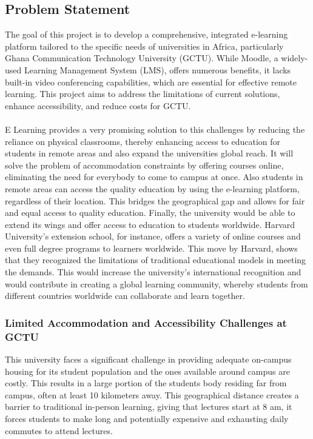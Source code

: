 \documentclass[a4paper,12pt]{article}  %
\begin{document}
\subsection{Problem Statement}
The goal of this project is to develop a comprehensive, integrated e-learning
platform tailored to the specific needs of universities in Africa, particularly
Ghana Communication Technology University (GCTU). While Moodle, a widely-used
Learning Management System (LMS), offers numerous benefits, it lacks built-in
video conferencing capabilities, which are essential for effective remote
learning. This project aims to address the limitations of current solutions,
enhance accessibility, and reduce costs for GCTU.\\ \vspace{0.2cm}\\ E Learning
provides a very promising solution to this challenges by reducing the reliance
on physical classrooms, thereby enhancing access to education for students in
remote areas and also expand the universities global reach. It will solve the
problem of accommodation constraints by offering courses online, eliminating
the need for everybody to come to campus at once. Also students in remote areas
can access the quality education by using the e-learning platform, regardless
of their location. This bridges the geographical gap and allows for fair and
equal access to quality education. Finally, the university would be able to
extend its wings and offer access to education to students worldwide. Harvard
University’s extension school, for instance, offers a variety of online courses
and even full degree programs to learners worldwide. This move by Harvard,
shows that they recognized the limitations of traditional educational models in
meeting the demands. This would increase the university’s international
recognition and would contribute in creating a global learning community,
whereby students from different countries worldwide can collaborate and learn
together.\\

\subsubsection{Limited Accommodation and Accessibility Challenges at GCTU}
This university faces a significant challenge in providing adequate on-campus
housing for its student population and the ones available around campus are
costly. This results in a large portion of the students body residing far from
campus, often at least 10 kilometers away. This geographical distance creates a
barrier to traditional in-person learning, giving that lectures start at 8 am,
it forces students to make long and potentially expensive and exhausting daily
commutes to attend lectures.\\
\end{document}

